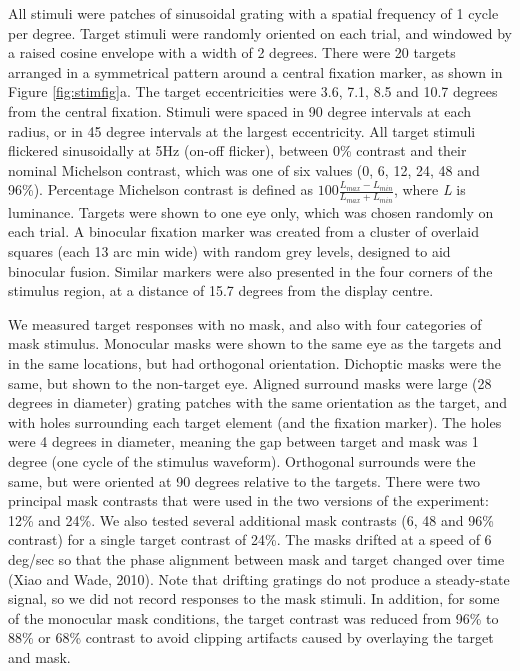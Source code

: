 \documentclass[]{article}
\begin{document}
All stimuli were patches of sinusoidal grating with a spatial frequency of 1 cycle per degree. Target stimuli were randomly oriented on each trial, and windowed by a raised cosine envelope with a width of 2 degrees. There were 20 targets arranged in a symmetrical pattern around a central fixation marker, as shown in Figure \ref{fig:stimfig}a. The target eccentricities were 3.6, 7.1, 8.5 and 10.7 degrees from the central fixation. Stimuli were spaced in 90 degree intervals at each radius, or in 45 degree intervals at the largest eccentricity. All target stimuli flickered sinusoidally at 5Hz (on-off flicker), between 0\% contrast and their nominal Michelson contrast, which was one of six values (0, 6, 12, 24, 48 and 96\%). Percentage Michelson contrast is defined as \(100\frac{L_{max}-L_{min}}{L_{max}+L_{min}}\), where \emph{L} is luminance. Targets were shown to one eye only, which was chosen randomly on each trial. A binocular fixation marker was created from a cluster of overlaid squares (each 13 arc min wide) with random grey levels, designed to aid binocular fusion. Similar markers were also presented in the four corners of the stimulus region, at a distance of 15.7 degrees from the display centre.

We measured target responses with no mask, and also with four categories of mask stimulus. Monocular masks were shown to the same eye as the targets and in the same locations, but had orthogonal orientation. Dichoptic masks were the same, but shown to the non-target eye. Aligned surround masks were large (28 degrees in diameter) grating patches with the same orientation as the target, and with holes surrounding each target element (and the fixation marker). The holes were 4 degrees in diameter, meaning the gap between target and mask was 1 degree (one cycle of the stimulus waveform). Orthogonal surrounds were the same, but were oriented at 90 degrees relative to the targets. There were two principal mask contrasts that were used in the two versions of the experiment: 12\% and 24\%. We also tested several additional mask contrasts (6, 48 and 96\% contrast) for a single target contrast of 24\%. The masks drifted at a speed of 6 deg/sec so that the phase alignment between mask and target changed over time (Xiao and Wade, 2010). Note that drifting gratings do not produce a steady-state signal, so we did not record responses to the mask stimuli. In addition, for some of the monocular mask conditions, the target contrast was reduced from 96\% to 88\% or 68\% contrast to avoid clipping artifacts caused by overlaying the target and mask.
\end{document}
